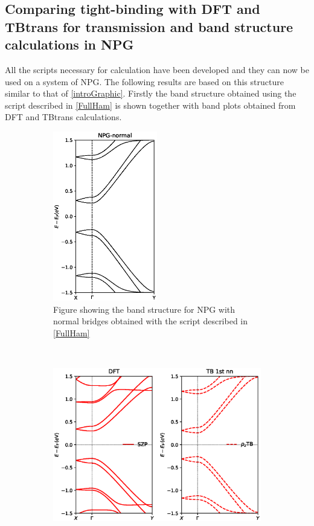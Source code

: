 \subsection{Comparing tight-binding with DFT and TBtrans for transmission and band structure calculations in NPG}\label{CompTB}
All the scripts necessary for calculation have been developed and they can now be used on a system of NPG.
The following results are based on this structure similar to that of \cref{introGraphic}. Firstly the band structure obtained using the script described in \cref{FullHam} is shown together with  band plots obtained from DFT and TBtrans calculations.
\begin{figure}[H]
	\centering
	\begin{subfigure}[t]{0.45\textwidth}
		\centering
		\includegraphics[width=0.5\textwidth]{Figures/NPG-normalBandstructures.eps}
		\caption{Figure showing the band structure for NPG with normal bridges obtained with the script described in \cref{FullHam}}
		\label{bsscript}
	\end{subfigure}
	~  %
	\begin{subfigure}[t]{0.45\textwidth}
		\centering
		\includegraphics[width=\textwidth]{Figures/bands.eps}

\end{subfigure}
\end{figure}
